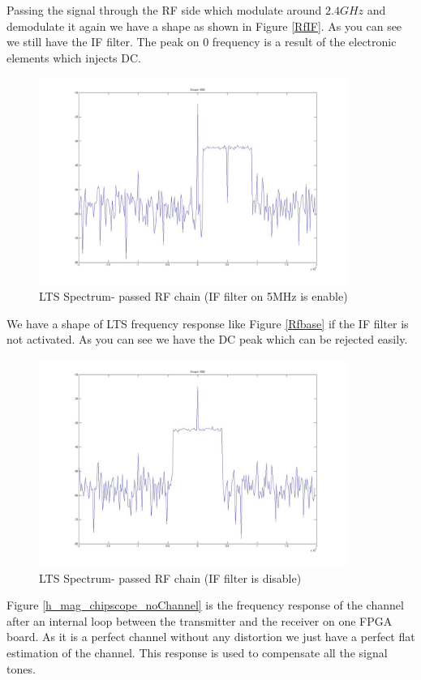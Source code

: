 Passing the signal through the RF side which modulate around $2.4 GHz$ and demodulate it again we have a shape as shown in Figure \ref{RfIF}. As you can see we still have the IF filter. The peak on 0 frequency is a result of the electronic elements which injects DC.\\

\begin{figure}
\centering
\includegraphics[width=10cm]{content/fig/RfIF.JPG}
\caption{LTS Spectrum- passed RF chain (IF filter  on 5MHz is enable)}
\label{fig:RfIF}
\end{figure}

We have a shape of LTS frequency response like Figure \ref{Rfbase} if the IF filter is not activated. As you can see we have the DC peak which can be rejected easily.\\

\begin{figure}
\centering
\includegraphics[width=10cm]{content/fig/Rfbase.JPG}
\caption{LTS Spectrum- passed RF chain (IF filter is disable)}
\label{fig:Rfbase}
\end{figure}

Figure \ref{h_mag_chipscope_noChannel} is the frequency response of the channel after an internal loop between the transmitter and the receiver on one FPGA board. As it is a perfect channel without any distortion we just have a perfect flat estimation of the channel. This response is used to compensate all the signal tones.\\

